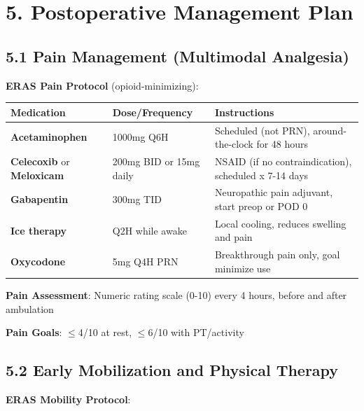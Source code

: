 \documentclass[11pt,letterpaper]{article}
\begin{document}
\section*{5. Postoperative Management Plan}

\subsection*{5.1 Pain Management (Multimodal Analgesia)}

\textbf{ERAS Pain Protocol} (opioid-minimizing):

\begin{longtable}{|p{3.5cm}|p{2.5cm}|p{7cm}|}
\hline
\textbf{Medication} & \textbf{Dose/Frequency} & \textbf{Instructions} \\ \hline
\textbf{Acetaminophen} & 1000mg Q6H & Scheduled (not PRN), around-the-clock for 48 hours \\ \hline
\textbf{Celecoxib} or \textbf{Meloxicam} & 200mg BID or 15mg daily & NSAID (if no contraindication), scheduled x 7-14 days \\ \hline
\textbf{Gabapentin} & 300mg TID & Neuropathic pain adjuvant, start preop or POD 0 \\ \hline
\textbf{Ice therapy} & Q2H while awake & Local cooling, reduces swelling and pain \\ \hline
\textbf{Oxycodone} & 5mg Q4H PRN & Breakthrough pain only, goal minimize use \\ \hline
\end{longtable}

\textbf{Pain Assessment}: Numeric rating scale (0-10) every 4 hours, before and after ambulation

\textbf{Pain Goals}: $\leq$4/10 at rest, $\leq$6/10 with PT/activity

\subsection*{5.2 Early Mobilization and Physical Therapy}

\textbf{ERAS Mobility Protocol}:
\end{document}
